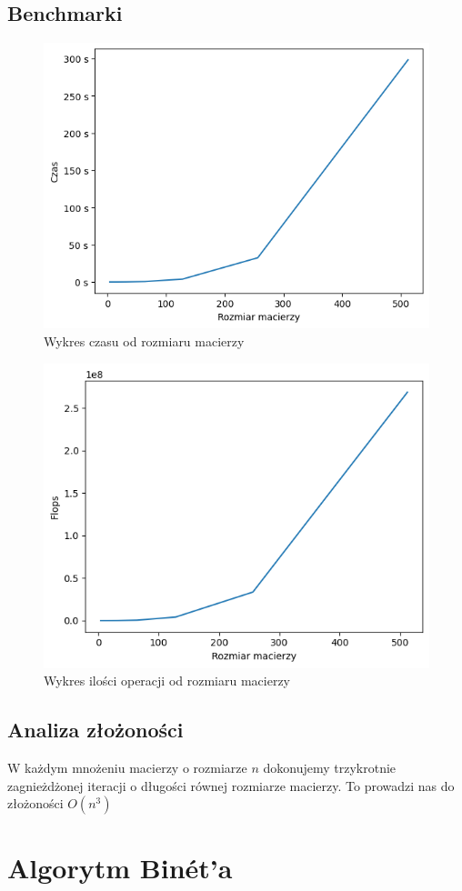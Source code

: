 \documentclass[12pt,a4paper,table]{article}
\begin{document}
    \subsection{Benchmarki}

    \begin{figure}[H]
        \centering
        \includegraphics[width=0.6\linewidth]{img/trad_times.png}
        \caption{Wykres czasu od rozmiaru macierzy}
        \label{fig:binet_times}
    \end{figure}

    \begin{figure}[H]
        \centering
        \includegraphics[width=0.6\linewidth]{img/trad_flops.png}
        \caption{Wykres ilości operacji od rozmiaru macierzy}
        \label{fig:binet_flops}
    \end{figure}

    \subsection{Analiza złożoności}
    W każdym mnożeniu macierzy o rozmiarze $n$ dokonujemy trzykrotnie zagnieżdżonej iteracji o długości równej rozmiarze macierzy.
    To prowadzi nas do złożoności $O(n^{3})$

    \newpage

    \section{Algorytm Binét'a}
\end{document}
